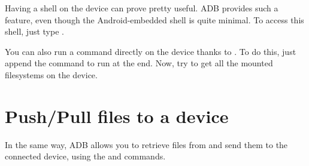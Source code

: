 Having a shell on the device can prove pretty useful. ADB provides such a feature,
even though the Android-embedded shell is quite minimal. To access this shell,
just type .

You can also run a command directly on the device thanks to . To do
this, just append the command to run at the end. Now, try to get all the mounted
filesystems on the device.

\section{Push/Pull files to a device}

In the same way, ADB allows you to retrieve files from and send them to the
connected device, using the  and  commands. 

